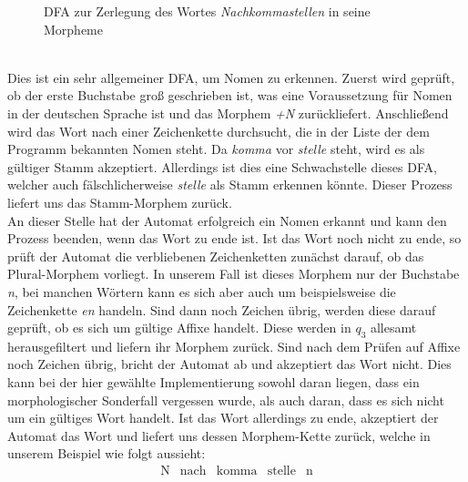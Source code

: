 \documentclass[12pt,twoside]{article}
\theoremstyle{plain}
\theoremstyle{definition}
\theoremstyle{remark}
\begin{document}
{\begin{figure}[h]
\caption{DFA zur Zerlegung des Wortes \textit{Nachkommastellen} in seine Morpheme}
\label{dfa1}
\end{figure}\\
Dies ist ein sehr allgemeiner DFA, um Nomen zu erkennen.
Zuerst wird geprüft, ob der erste Buchstabe groß geschrieben ist, was eine Voraussetzung für Nomen in der deutschen Sprache ist und das Morphem \textit{+N} zurückliefert.
Anschließend wird das Wort nach einer Zeichenkette durchsucht, die in der Liste der dem Programm bekannten Nomen steht.
Da \textit{komma} vor \textit{stelle} steht, wird es als gültiger Stamm akzeptiert.
Allerdings ist dies eine Schwachstelle dieses DFA, welcher auch fälschlicherweise \textit{stelle} als Stamm erkennen könnte. Dieser Prozess liefert uns das Stamm-Morphem zurück.\\
An dieser Stelle hat der Automat erfolgreich ein Nomen erkannt und kann den Prozess beenden, wenn das Wort zu ende ist.
Ist das Wort noch nicht zu ende, so prüft der Automat die verbliebenen Zeichenketten zunächst darauf, ob das Plural-Morphem vorliegt. 
In unserem Fall ist dieses Morphem nur der Buchstabe \textit{n}, bei manchen Wörtern kann es sich aber auch um beispielsweise die Zeichenkette \textit{en} handeln.
Sind dann noch Zeichen übrig, werden diese darauf geprüft, ob es sich um gültige Affixe handelt. Diese werden in $q_3$ allesamt herausgefiltert und liefern ihr Morphem zurück.
Sind nach dem Prüfen auf Affixe noch Zeichen übrig, bricht der Automat ab und akzeptiert das Wort nicht.
Dies kann bei der hier gewählte Implementierung sowohl daran liegen, dass ein morphologischer Sonderfall vergessen wurde, als auch daran, dass es sich nicht um ein gültiges Wort handelt.
Ist das Wort allerdings zu ende, akzeptiert der Automat das Wort und liefert uns dessen Morphem-Kette zurück, welche in unserem Beispiel wie folgt aussieht:
\begin{equation*}
\begin{array}{ccccc}
	\text{N} & \text{nach} & \text{komma} & \text{stelle} & \text{n}	\\

\end{array}
\end{equation*}}
\end{document}
